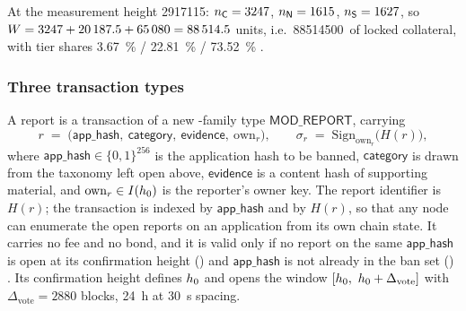 
At the measurement height \num{2917115}: $n_{\mathsf{C}} = \num{3247}$, $n_{\mathsf{N}} = \num{1615}$,
$n_{\mathsf{S}} = \num{1627}$, so $W = \num{3247} + \num{20187.5} + \num{65080} = \num{88514.5}$
units, i.e.\ \num{88514500}\flux\ of locked collateral, with tier shares
\SI{3.67}{\percent} / \SI{22.81}{\percent} / \SI{73.52}{\percent}
.

\subsubsection{Three transaction types}

\begin{definition}
\label{def:23:report}
A report is a \fluxd{} transaction of a new \FluxNode-family type $\mathsf{MOD\_REPORT}$, carrying
\[
r \;=\; \bigl(\mathsf{app\_hash},\ \mathsf{category},\ \mathsf{evidence},\ \mathrm{own}_r\bigr),
\qquad
\sigma_r \;=\; \mathrm{Sign}_{\mathrm{own}_r}\bigl(H(r)\bigr),
\]
where $\mathsf{app\_hash} \in \{0,1\}^{256}$ is the application hash to be banned, $\mathsf{category}$
is drawn from the taxonomy left open above, $\mathsf{evidence}$ is a content hash of supporting
material, and $\mathrm{own}_r \in I(h_0)$ is the reporter's owner key. The report identifier is
$H(r)$; the transaction is indexed by $\mathsf{app\_hash}$ and by $H(r)$, so that any node can
enumerate the open reports on an application from its own chain state. It carries no fee and no
bond, and it is valid only if no report on the same $\mathsf{app\_hash}$ is open at its confirmation
height () and $\mathsf{app\_hash}$ is not already in the ban set
() . Its confirmation
height defines $h_0$ and opens the window
$[h_0,\ h_0 + \Delta_{\mathrm{vote}}]$ with $\Delta_{\mathrm{vote}} = \num{2880}$ blocks,
\SI{24}{\hour} at \SI{30}{\second} spacing.
\end{definition}

